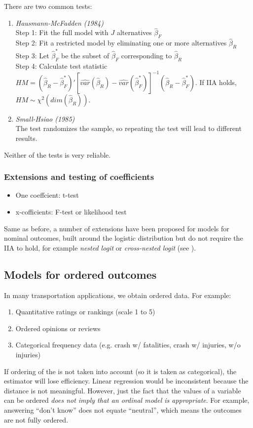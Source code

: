 				There are two common tests:
				\begin{enumerate}
					\item \emph{Hausmann-McFadden (1984)}\\
					Step 1: Fit the full model with $J$ alternatives $\hat{\beta}_F$\\
					Step 2: Fit a restricted model by eliminating one or more alternatives $\hat{\beta}_R$\\
					Step 3: Let $\hat{\beta}^*_F$ be the subset of $\hat{\beta}_F$ corresponding to $\hat{\beta}_R$\\
					Step 4: Calculate test statistic $HM=(\hat{\beta}_R-\hat{\beta}_F^*)'\left[\widehat{var}(\hat{\beta}_R)-\widehat{var}(\hat{\beta}_F^*)\right]^{-1}(\hat{\beta}_R-\hat{\beta}_F^*)$. If IIA holds, $HM\sim \chi^2(dim(\hat{\beta}_R))$.			
					\item \emph{Small-Hsiao (1985)}\\
					The test randomizes the sample, so repeating the test will lead to different results.
				\end{enumerate}
				Neither of the tests is very reliable.
		\subsubsection{Extensions and testing of coefficients}
			\begin{itemize}
				\item One coeffcient: t-test
				\item x-cofficients: F-test or likelihood test
			\end{itemize}
			Same as before, a number of extensions have been proposed for models for nominal outcomes, built around the logistic distribution but do not require the IIA to hold, for example \emph{nested logit} or \emph{cross-nested logit} (see \textcite{Train.2009}).
	\subsection{Models for ordered outcomes}	
		In many transportation applications, we obtain ordered data. For example:
		\begin{enumerate}
			\item Quantitative ratings or rankings (scale 1 to 5)
			\item Ordered opinions or reviews
			\item Categorical frequency data (e.g. crash w/ fatalities, crash w/ injuries, w/o injuries)
		\end{enumerate}		
		If ordering of the is not taken into account (so it is taken as categorical), the estimator will lose efficiency. Linear regression would be inconsistent because the distance is not meaningful. However, just the fact that the values of a variable can be ordered \emph{does not imply that an ordinal model is appropriate}. For example, answering \enquote{don't know} does not equate \enquote{neutral}, which means the outcomes are not fully ordered.
		
